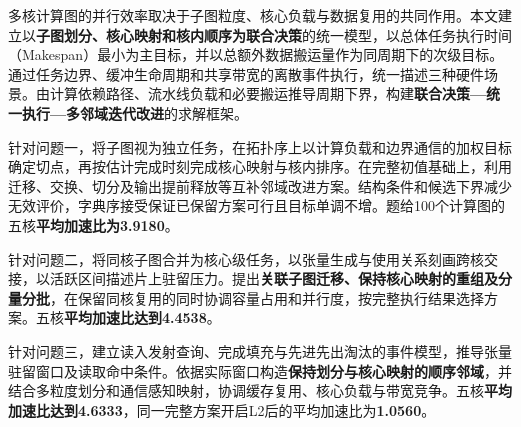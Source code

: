 多核计算图的并行效率取决于子图粒度、核心负载与数据复用的共同作用。本文建立以\textbf{子图划分、核心映射和核内顺序为联合决策}的统一模型，以总体任务执行时间（Makespan）最小为主目标，并以总额外数据搬运量作为同周期下的次级目标。通过任务边界、缓冲生命周期和共享带宽的离散事件执行，统一描述三种硬件场景。由计算依赖路径、流水线负载和必要搬运推导周期下界，构建\textbf{联合决策—统一执行—多邻域迭代改进}的求解框架。

针对问题一，将子图视为独立任务，在拓扑序上以计算负载和边界通信的加权目标确定切点，再按估计完成时刻完成核心映射与核内排序。在完整初值基础上，利用迁移、交换、切分及输出提前释放等互补邻域改进方案。结构条件和候选下界减少无效评价，字典序接受保证已保留方案可行且目标单调不增。题给100个计算图的五核\textbf{平均加速比为3.9180}。

针对问题二，将同核子图合并为核心级任务，以张量生成与使用关系刻画跨核交接，以活跃区间描述片上驻留压力。提出\textbf{关联子图迁移、保持核心映射的重组及分量分批}，在保留同核复用的同时协调容量占用和并行度，按完整执行结果选择方案。五核\textbf{平均加速比达到4.4538}。

针对问题三，建立读入发射查询、完成填充与先进先出淘汰的事件模型，推导张量驻留窗口及读取命中条件。依据实际窗口构造\textbf{保持划分与核心映射的顺序邻域}，并结合多粒度划分和通信感知映射，协调缓存复用、核心负载与带宽竞争。五核\textbf{平均加速比达到4.6333}，同一完整方案开启L2后的平均加速比为\textbf{1.0560}。
